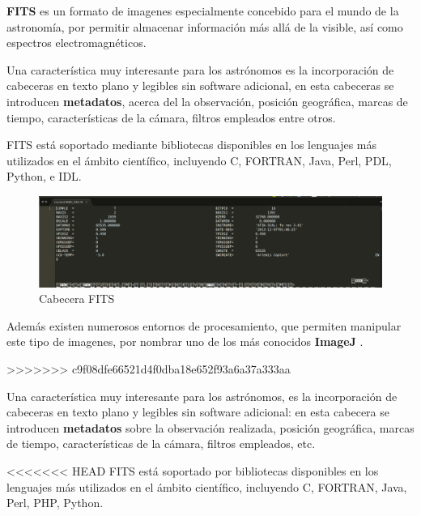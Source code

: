 \begin{itemize}
\begin{itemize}
\bigskip
\textbf{FITS} es un formato de imagenes especialmente concebido para el mundo de la astronomía, por permitir almacenar información más allá de la visible, así como espectros electromagnéticos.

\bigskip
Una característica muy interesante para los astrónomos es la incorporación de cabeceras en texto plano y legibles sin software adicional, en esta cabeceras se introducen \textbf{metadatos}, acerca del la observación,  posición geográfica, marcas de tiempo,  características de la cámara, filtros empleados entre otros.

\bigskip
FITS está soportado mediante bibliotecas disponibles en los lenguajes más utilizados en el ámbito científico, incluyendo C, FORTRAN, Java, Perl, PDL, Python, e IDL. 

\begin{figure}[h]
	\centering
	\includegraphics[width=1.0\linewidth]{../images/fit}
	\caption[Cabecera FITS]{Cabecera FITS}
	\label{fig:fit}
	\end{figure}
	
	\bigskip
	Además existen numerosos entornos de procesamiento, que permiten manipular este tipo de imagenes, por nombrar uno de los más conocidos \textbf{ImageJ} \cite{Imagej}.
	
>>>>>>> c9f08dfe66521d4f0dba18e652f93a6a37a333aa

Una característica muy interesante para los astrónomos, es la incorporación de cabeceras en texto plano y legibles sin software adicional: en esta cabecera se introducen \textbf{metadatos} sobre la observación realizada, posición geográfica, marcas de tiempo, características de la cámara, filtros empleados, etc.


<<<<<<< HEAD
FITS está soportado por bibliotecas disponibles en los lenguajes más utilizados en el ámbito científico, incluyendo C, FORTRAN, Java, Perl, PHP, Python.


\end{itemize}
\end{itemize}
